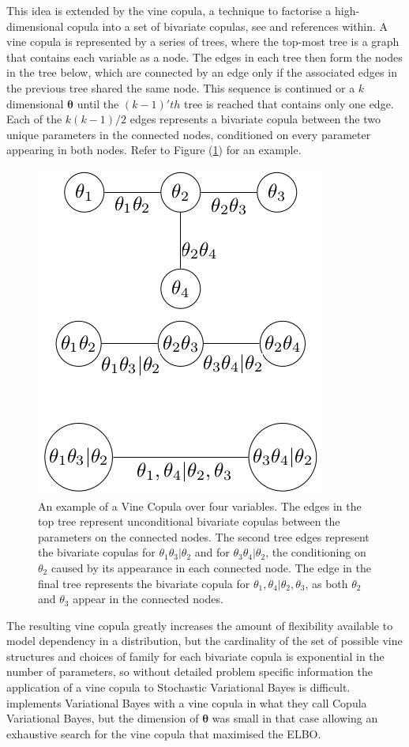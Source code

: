 \documentclass[12pt,a4paper]{article}%
\numberwithin{equation}{section}
\begin{document}
This idea is extended by the vine copula, a technique to factorise a high-dimensional copula into a set of bivariate copulas, see \citet{Joe2014} and references within. A vine copula is represented by a series of trees, where the top-most tree is a graph that contains each variable as a node. The edges in each tree then form the nodes in the tree below, which are connected by an edge only if the associated edges in the previous tree shared the same node. This sequence is continued or a $k$ dimensional $\boldsymbol{\theta}$ until the $(k-1)'th$ tree is reached that contains only one edge. Each of the $k(k-1)/2$ edges represents a bivariate copula between the two unique parameters in the connected nodes, conditioned on every parameter appearing in both nodes. Refer to Figure (\ref{fig:vinecop}) for an example.

\begin{figure}[h]
\centering
\includegraphics[width=0.4\linewidth,height=\textheight,keepaspectratio]{vines.png}
\caption{An example of a Vine Copula over four variables. The edges in the top tree represent unconditional bivariate copulas between the parameters on the connected nodes. The second tree edges represent the bivariate copulas for $\theta_1 \theta_3 | \theta_2$ and for $\theta_3 \theta_4 | \theta_2$, the conditioning on $\theta_2$ caused by its appearance in each connected node. The edge in the final tree represents the bivariate copula for $\theta_1, \theta_4 | \theta_2, \theta_3$, as both $\theta_2$ and $\theta_3$ appear in the connected nodes.}
\label{fig:vinecop}
\end{figure}

The resulting vine copula greatly increases the amount of flexibility available to model dependency in a distribution, but the cardinality of the set of possible vine structures and choices of family for each bivariate copula is exponential in the number of parameters, so without detailed problem specific information the application of a vine copula to Stochastic Variational Bayes is difficult. \citet{Tran2015} implements Variational Bayes with a vine copula in what they call Copula Variational Bayes, but the dimension of $\boldsymbol{\theta}$ was small in that case allowing an exhaustive search for the vine copula that maximised the ELBO. 
\end{document}

